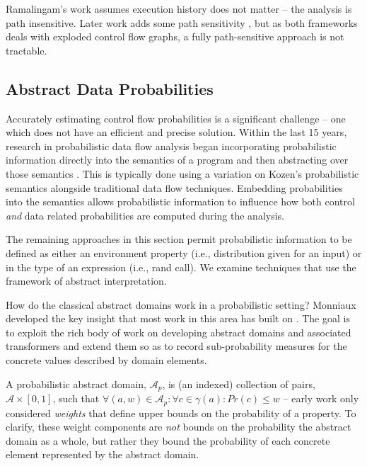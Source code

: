 Ramalingam's work assumes execution history does not matter --  
the analysis is path insensitive.
Later work adds some path sensitivity \cite{mehofer2001novel}, 
but as both frameworks deals with exploded control flow graphs, a fully 
path-sensitive approach is not tractable.

\subsection{Abstract Data Probabilities}
Accurately estimating control flow probabilities is a significant
challenge -- one which does not have an efficient and precise solution.
Within the last 15 years, research in probabilistic data flow analysis
began incorporating probabilistic information directly into
the semantics of a program and then abstracting over 
those semantics \cite{monniaux2000abstract,others}.
This is typically done using a variation on Kozen's 
probabilistic semantics \cite{kozen1981semantics} 
alongside traditional data flow techniques.
Embedding probabilities into the semantics allows probabilistic
information to influence how both control {\sl and} data related
probabilities are computed during the analysis.

The remaining approaches in this section permit probabilistic
information to be defined as either an environment property
(i.e., distribution given for an input) or in the type of
an expression (i.e., rand call).
We examine techniques that use the framework of abstract
interpretation.

How do the classical abstract domains work in a
probabilistic setting?
Monniaux \cite{monniaux2000abstract} developed the key 
insight that most work in this area has built on 
\cite{monniaux2001backwards,wachter2010best,esparza2011probabilistic}.
The goal is to exploit the rich body of work on developing
abstract domains and associated transformers and extend them
so as to record sub-probability measures for the concrete values
described by domain elements.  



A probabilistic abstract domain, $\mathcal{A}_p$, 
is (an indexed) collection of pairs, 
$\mathcal{A} \times [0,1]$,
such that $\forall (a,w) \in \mathcal{A}_p : 
\forall c \in \gamma(a) : Pr(c) \le w$ -- early work only
considered \textit{weights} that define upper bounds on the 
probability of a property. 
To clarify, these weight components are \textit{not} bounds on the probability
the abstract domain as a whole, but rather they bound the probability
of each concrete element represented by the abstract domain.

